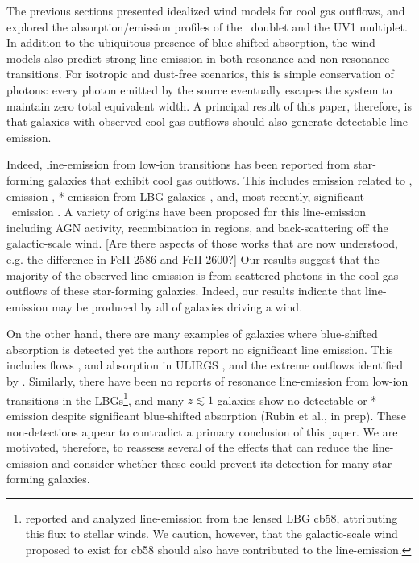 \documentclass[12pt,preprint]{aastex}
\begin{document}
The previous sections presented idealized wind models for
cool gas outflows, and explored the absorption/emission profiles of
the \mgiid\ doublet and the  UV1 multiplet.  In addition to
the ubiquitous presence of blue-shifted absorption, the wind models
also predict strong line-emission in both resonance
and non-resonance transitions.  For isotropic and dust-free scenarios,
this is simple conservation of photons: every photon emitted by
the source eventually escapes the system to maintain
zero total equivalent width. A principal result of this paper,
therefore, is that galaxies with observed cool gas outflows should
also generate detectable line-emission.
 
Indeed, line-emission from low-ion transitions has been reported from 
star-forming galaxies that exhibit cool gas outflows.  
This includes emission related to  \citep{phillips,chen},
 emission \citep{wcp+09,rwk+10}, 
* emission from LBG galaxies \citep{shapley03},
and, most recently, significant \feiis\ emission \citep{rubin+10c}. 
A variety of origins have been proposed for this
line-emission including AGN activity, recombination in 
regions, and back-scattering off the galactic-scale wind.
[Are there aspects of those works that are now understood, e.g. the
difference in FeII 2586 and FeII 2600?]
Our results suggest that the majority of the observed line-emission is 
from scattered photons in the cool gas outflows of these star-forming
galaxies.  Indeed, our results indicate that line-emission may
be produced by all of galaxies driving a wind.

On the other hand,
there are many examples of galaxies where blue-shifted absorption is
detected yet the authors report no significant line emission.  This
includes  flows \cite{rvs05a,martin,smn+09}, 
 and  absorption in
ULIRGS \citep{mb09}, and the extreme  outflows identified
by \cite{tmd07}.  Similarly, there have been no reports of
resonance line-emission from low-ion transitions in the
LBGs\footnote{\citet{psa+00}
  reported and analyzed  line-emission from the lensed LBG
  cb58, attributing this flux to stellar winds.  We caution, however,
  that the galactic-scale wind proposed to exist for cb58 should also
  have contributed to the  line-emission.}, and many
$z \lesssim 1$ galaxies show no detectable  or *
emission despite significant blue-shifted absorption (Rubin et al., in prep). 
These non-detections appear to contradict a primary conclusion of 
this paper.   We are motivated, therefore, to
reassess several of the effects that can reduce the line-emission
and consider whether these could prevent its detection for many
star-forming galaxies.  
\end{document}
